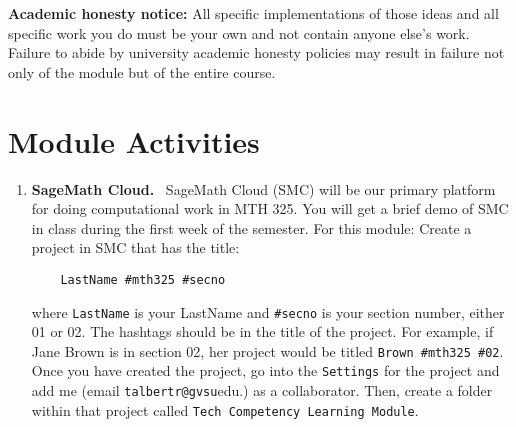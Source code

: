 \documentclass[11pt,letterpaper]{article}
\begin{document}
\smallskip

\textbf{Academic honesty notice:} All specific implementations of those ideas and all specific work you do must be your own and not contain anyone else's work. Failure to abide by university academic honesty policies may result in failure not only of the module but of the entire course. 

\section*{Module Activities}

\begin{enumerate}

\item \textbf{SageMath Cloud.} \ SageMath Cloud (SMC) will be our primary platform for doing computational work in MTH 325. You will get a brief demo of SMC in class during the first week of the semester. For this module: Create a project in SMC that has the title: 
\begin{verbatim}
	LastName #mth325 #secno
\end{verbatim}
where \verb.LastName. is your LastName and \verb.#secno. is your section number, either 01 or 02. The hashtags should be in the title of the project. For example, if Jane Brown is in section 02, her project would be titled \verb.Brown #mth325 #02.. Once you have created the project, go into the \verb.Settings. for the project and add me (email \verb.talbertr@gvsu.edu.) as a collaborator. Then, create a folder within that project called \verb.Tech Competency Learning Module.. 


\end{enumerate}
\end{document}
